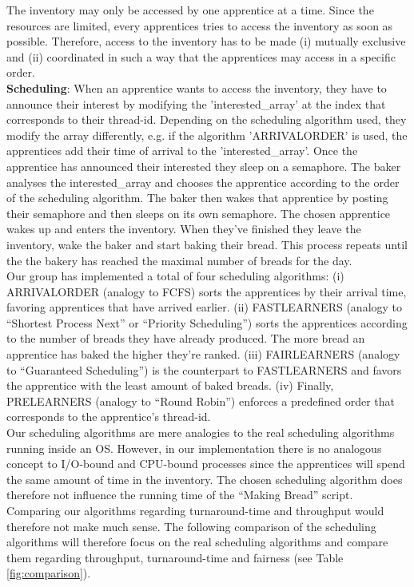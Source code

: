 \documentclass[11pt]{article}
\begin{document}
The inventory may only be accessed by one apprentice at a time. Since the resources are limited, every apprentices tries to access the inventory as soon as possible. Therefore, access to the inventory has to be made (i) mutually exclusive and (ii) coordinated in such a way that the apprentices may access in a specific order.\\

\textbf{Scheduling}: When an apprentice wants to access the inventory, they have to announce their interest by modifying the 'interested\_array' at the index that corresponds to their thread-id. Depending on the scheduling algorithm used, they modify the array differently, e.g. if the algorithm 'ARRIVALORDER' is used, the apprentices add their time of arrival to the 'interested\_array'. Once the apprentice has announced their interested they sleep on a semaphore. The baker analyses the interested\_array and chooses the apprentice according to the order of the scheduling algorithm. The baker then wakes that apprentice by posting their semaphore and then sleeps on its own semaphore. The chosen apprentice wakes up and enters the inventory. When they've finished they leave the inventory, wake the baker and start baking their bread. This process repeats until the the bakery has reached the maximal number of breads for the day.\\

Our group has implemented a total of four scheduling algorithms: (i) ARRIVALORDER (analogy to FCFS) sorts the apprentices by their arrival time, favoring apprentices that have arrived earlier. (ii) FASTLEARNERS (analogy to ``Shortest Process Next'' or ``Priority Scheduling'') sorts the apprentices according to the number of breads they have already produced. The more bread an apprentice has baked the higher they're ranked. (iii) FAIRLEARNERS (analogy to ``Guaranteed Scheduling'') is the counterpart to FASTLEARNERS and favors the apprentice with the least amount of baked breads. (iv) Finally, PRELEARNERS (analogy to ``Round Robin'') enforces a predefined order that corresponds to the apprentice's thread-id.\\

Our scheduling algorithms are mere analogies to the real scheduling algorithms running inside an OS. However, in our implementation there is no analogous concept to I/O-bound and CPU-bound processes since the apprentices will spend the same amount of time in the inventory. The chosen scheduling algorithm does therefore not influence the running time of the ``Making Bread'' script. Comparing our algorithms regarding turnaround-time and throughput would therefore not make much sense. The following comparison of the scheduling algorithms will therefore focus on the real scheduling algorithms and compare them regarding throughput, turnaround-time and fairness (see Table \ref{fig:comparison}).\\
\end{document}
